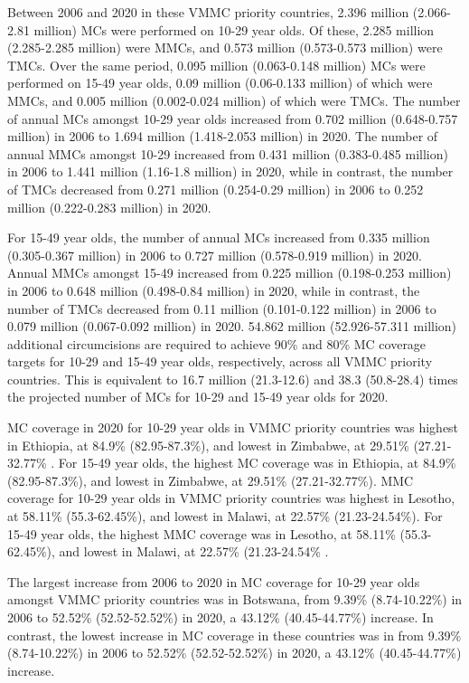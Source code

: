 \documentclass{article}
\begin{document}
Between 2006 and 2020 in these VMMC priority countries, 2.396 million (2.066-2.81 million) MCs were performed on 10-29 year olds. Of these, 2.285 million (2.285-2.285 million) were MMCs, and 0.573 million (0.573-0.573 million) were TMCs. Over the same period, 0.095 million (0.063-0.148 million) MCs were performed on 15-49 year olds, 0.09 million (0.06-0.133 million) of which were MMCs, and 0.005 million (0.002-0.024 million) of which were TMCs. The number of annual MCs amongst 10-29 year olds increased from 0.702 million (0.648-0.757 million) in 2006 to 1.694 million (1.418-2.053 million) in 2020. The number of annual MMCs amongst 10-29 increased from 0.431 million (0.383-0.485 million) in 2006 to 1.441 million (1.16-1.8 million) in 2020, while in contrast, the number of TMCs decreased from 0.271 million (0.254-0.29 million) in 2006 to 0.252 million (0.222-0.283 million) in 2020.

For 15-49 year olds, the number of annual MCs increased from 0.335 million (0.305-0.367 million) in 2006 to 0.727 million (0.578-0.919 million) in 2020. Annual MMCs amongst 15-49 increased from 0.225 million (0.198-0.253 million) in 2006 to 0.648 million (0.498-0.84 million) in 2020, while in contrast, the number of TMCs decreased from 0.11 million (0.101-0.122 million) in 2006 to 0.079 million (0.067-0.092 million) in 2020. 54.862 million (52.926-57.311 million) additional circumcisions are required to achieve 90\% and 80\% MC coverage targets for 10-29 and 15-49 year olds, respectively, across all VMMC priority countries. This is equivalent to 16.7 million (21.3-12.6) and 38.3 (50.8-28.4) times the projected number of MCs for 10-29 and 15-49 year olds for 2020.

MC coverage in 2020 for 10-29 year olds in VMMC priority countries was highest in Ethiopia, at 84.9\% (82.95-87.3\%), and lowest in Zimbabwe, at 29.51\% (27.21-32.77\% . For 15-49 year olds, the highest MC coverage was in Ethiopia, at 84.9\% (82.95-87.3\%), and lowest in Zimbabwe, at 29.51\% (27.21-32.77\%). MMC coverage for 10-29 year olds in VMMC priority countries was highest in Lesotho, at 58.11\% (55.3-62.45\%), and lowest in Malawi, at 22.57\% (21.23-24.54\%). For 15-49 year olds, the highest MMC coverage was in Lesotho, at 58.11\% (55.3-62.45\%), and lowest in Malawi, at 22.57\% (21.23-24.54\% .

The largest increase from 2006 to 2020 in MC coverage for 10-29 year olds amongst VMMC priority countries was in Botswana, from 9.39\% (8.74-10.22\%) in 2006 to 52.52\% (52.52-52.52\%) in 2020, a 43.12\% (40.45-44.77\%) increase. In contrast, the lowest increase in MC coverage in these countries was in from 9.39\% (8.74-10.22\%) in 2006 to 52.52\% (52.52-52.52\%) in 2020, a 43.12\% (40.45-44.77\%) increase.
\end{document}
